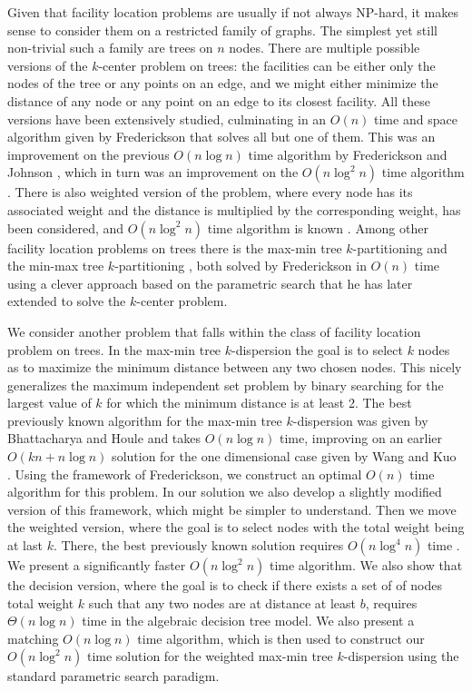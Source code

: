 \documentclass[11pt,a4paper]{article}
\newcommand{\Oh}{{O}}
\theoremstyle{definition}
\theoremstyle{remark}
\begin{document}
Given that facility location problems are usually if not always
NP-hard, it makes sense to consider them on a restricted family of
graphs. The simplest yet still non-trivial such a family are trees on
$n$ nodes. There are multiple possible versions of the $k$-center
problem on trees: the facilities can be either only the nodes of the
tree or any points on an edge, and we might either minimize the
distance of any node or any point on an edge to its closest facility.
All these versions have been extensively studied, culminating in an
$\Oh(n)$ time and space algorithm given by Frederickson \cite{Frederickson1991a} that
solves all but one of them. This was an improvement on the previous
$\Oh(n\log n)$ time algorithm by Frederickson and Johnson \cite{Frederickson1983}, which in turn was an improvement
on the $\Oh(n\log^2n)$ time algorithm \cite{Megiddo1981}. There is also weighted version
of the problem, where every node has its associated weight and the
distance is multiplied by the corresponding weight, has been
considered, and $\Oh(n\log^2n)$ time algorithm is known %
\cite{Megiddo1983}. Among other facility location problems on trees there
is the max-min tree $k$-partitioning \cite{Perl1981} and the min-max tree
$k$-partitioning \cite{Becker1982}, both solved by Frederickson in $\Oh(n)$ time
\cite{Frederickson1991} using a clever approach based on the parametric search that
he has later extended to solve the $k$-center problem.

We consider another problem that falls within the class of facility
location problem on trees. In the max-min tree $k$-dispersion the goal
is to select $k$ nodes as to maximize the minimum distance between any
two chosen nodes. This nicely generalizes the maximum independent set
problem by binary searching for the largest value of $k$ for which the
minimum distance is at least 2. The best previously known algorithm
for the max-min tree $k$-dispersion was given by Bhattacharya and Houle
\cite{Bhattacharya1991} and takes $\Oh(n\log n)$ time, improving on an earlier $\Oh(kn+n\log n)$
solution for the one dimensional case given by Wang and Kuo~\cite{Wang1988} . Using the
framework of Frederickson, we construct an optimal $\Oh(n)$ time algorithm
for this problem. In our solution we also develop a slightly modified
version of this framework, which might be simpler to understand. Then
we move the weighted version, where the goal is to select nodes with
the total weight being at last $k$. There, the best previously known
solution requires $\Oh(n\log^4 n)$ time \cite{Bhattacharya1991}. We present a significantly
faster $\Oh(n\log^2 n)$ time algorithm. We also show that the decision
version, where the goal is to check if there exists a set of of nodes
total weight $k$ such that any two nodes are at distance at least $b$,
requires $\Theta(n\log n)$ time in the algebraic decision tree model. We
also present a matching $\Oh(n\log n)$ time algorithm, which is then used
to construct our $\Oh(n\log^2n)$ time solution for the weighted max-min
tree $k$-dispersion using the standard parametric search paradigm. 
\end{document}
